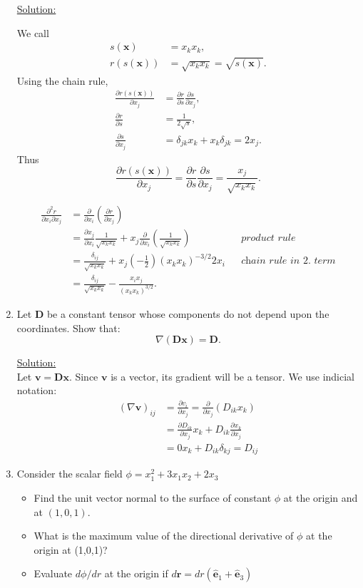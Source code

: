 \documentclass{article}
\newcommand{\ee}{\end{equation}}
\newcommand{\be}{\begin{equation}}
\newcommand{\bi}{\begin{itemize}}
\newcommand{\ei}{\end{itemize}}
\newcommand{\pa}{\partial}
\newcommand{\bs}{\boldsymbol}
\begin{document}
\begin{enumerate}
\underline{Solution:}

We call
\begin{align}
s(\bs x) &= x_k x_k, \\
r(s(\bs x)) &= \sqrt{x_k x_k} = \sqrt{s(\bs x)}.
\end{align}
Using the chain rule,
\begin{align}
\frac{\pa r(s(\bs x))}{\pa x_j} &= \frac{\pa r}{\pa s} \frac{\pa s}{\pa x_j}, \\
\frac{\pa r}{\pa s} &= \frac{1}{2\sqrt{s}}, \\
\frac{\pa s}{\pa x_j} &= \delta_{jk} x_k + x_k \delta_{jk} = 2x_j.
\end{align}
Thus
\be
\frac{\pa r(s(\bs x))}{\pa x_j} = \frac{\pa r}{\pa s} \frac{\pa s}{\pa x_j} = \frac{x_j}{\sqrt{x_k x_k}}.
\ee

\begin{align}
\frac{\pa^2 r}{\pa x_i \pa x_j} &= \frac{\pa }{\pa x_i}\left(\frac{\pa r}{\pa x_j}\right) && \\
&= \frac{\pa x_j}{\pa x_i} \frac{1}{\sqrt{x_k x_k}} + x_j \frac{\pa}{\pa x_i} \left(\frac{1}{\sqrt{x_k x_k}}\right) &&\textit{product rule} \\
&= \frac{\delta_{ij}}{\sqrt{x_k x_k}} + x_j \left(-\frac{1}{2}\right) \left(x_k x_k\right)^{-3/2} 2x_i &&\textit{chain rule in 2. term} \\
&= \frac{\delta_{ij}}{\sqrt{x_k x_k}} - \frac{x_i x_j}{\left(x_k x_k\right)^{3/2}}.
\end{align}

\item Let $\bs{D}$ be a constant tensor whose components do not depend upon
the coordinates. Show that:
\be
\nabla (\bs{D} \bs{x})=\bs{D}.
\ee

\underline{Solution:} \\
Let  $\bs{v}=\bs{D} \bs{x}$. Since $\bs{v}$ is a vector, its gradient will be a tensor. We use indicial notation:
\be
\begin{array}{ll}
(\nabla \bs{v})_{ij}& =\frac{\pa v_i}{\pa x_j}=\frac{\pa  }{\pa x_j}(D_{ik}x_k) \\
& = \frac{\pa D_{ik}}{\pa x_j} x_k +D_{ik} \frac{\pa  x_k}{\pa x_j} \\
& = 0 x_k +D_{ik} \delta_{kj}=D_{ij}
\end{array}
\ee

\item Consider the scalar field $\phi=x_1^2+3x_1x_2+2x_3$
\bi
\item Find the unit vector normal to the surface of constant $\phi$ at the origin and at $(1,0,1)$. 
\item What is the maximum value of the directional derivative of $\phi$ at the origin at (1,0,1)? 
\item Evaluate $d\phi/d r$ at the origin if $d\bs{r}=dr(\bs{\hat{e}}_1+\bs{\hat{e}}_3)$
\ei


\end{enumerate}
\end{document}
